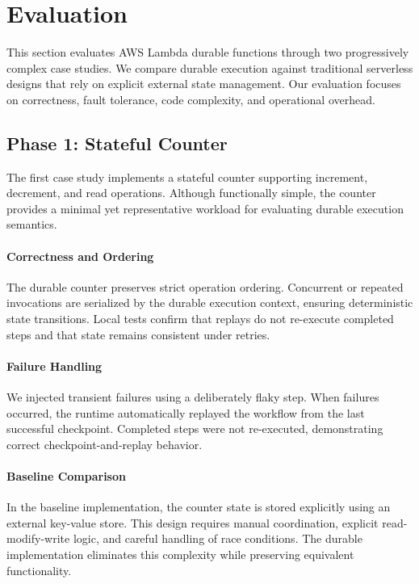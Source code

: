 \section{Evaluation}
\label{sec:evaluation}

This section evaluates AWS Lambda durable functions through two progressively complex case studies. We compare durable execution against traditional serverless designs that rely on explicit external state management. Our evaluation focuses on correctness, fault tolerance, code complexity, and operational overhead.

\subsection{Phase 1: Stateful Counter}

The first case study implements a stateful counter supporting increment, decrement, and read operations. Although functionally simple, the counter provides a minimal yet representative workload for evaluating durable execution semantics.

\paragraph{Correctness and Ordering}
The durable counter preserves strict operation ordering. Concurrent or repeated invocations are serialized by the durable execution context, ensuring deterministic state transitions. Local tests confirm that replays do not re-execute completed steps and that state remains consistent under retries.

\paragraph{Failure Handling}
We injected transient failures using a deliberately flaky step. When failures occurred, the runtime automatically replayed the workflow from the last successful checkpoint. Completed steps were not re-executed, demonstrating correct checkpoint-and-replay behavior.

\paragraph{Baseline Comparison}
In the baseline implementation, the counter state is stored explicitly using an external key-value store. This design requires manual coordination, explicit read-modify-write logic, and careful handling of race conditions. The durable implementation eliminates this complexity while preserving equivalent functionality.

